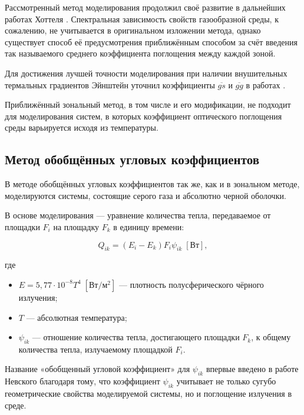 Рассмотренный метод моделирования продолжил своё развитие в дальнейших работах Хоттеля \cite{hottel-1, hottel-2}.
Спектральная зависимость свойств газообразной среды, к сожалению, не учитывается в оригинальном изложении метода, однако существует способ её предусмотрения приближённым способом за счёт введения так называемого среднего коэффициента поглощения между каждой зоной.

Для достижения лучшей точности моделирования при наличии внушительных термальных градиентов Эйнштейн уточнил коэффициенты $\overline{gs}$ и $\overline{gg}$ в работах \cite{einstein-1, einstein-2}.

Приближённый зональный метод, в том числе и его модификации, не подходит для моделирования систем, в которых коэффициент оптического поглощения среды варьируется исходя из температуры.

\subsection{Метод обобщённых угловых коэффициентов}

В методе обобщённых угловых коэффициентов так же, как и в зональном методе, моделируются системы, состоящие серого газа и абсолютно черной оболочки.

В основе моделирования — уравнение количества тепла, передаваемое от площадки $F_i$ на площадку $F_k$ в единицу времени:

\begin{equation}
	Q_{ik} = (E_i - E_k) F_i \psi_{ik} \; [\text{Вт}],
\end{equation}

\noindent где
\begin{itemize}
	\item $E = 5,77 \cdot 10^{-8} T^4 \; [\text{Вт}/\text{м}^2]$ — плотность полусферического чёрного излучения;
	\item $T$ — абсолютная температура;
	\item $\psi_{ik}$ — отношение количества тепла, достигающего площадки $F_k$, к общему количества тепла, излучаемому площадкой $F_i$.
\end{itemize}

Название «обобщенный угловой коэффициент» для $\psi_{ik}$ впервые введено в работе Невского \cite{nevskiy} благодаря тому, что коэффициент $\psi_{ik}$ учитывает не только сугубо геометрические свойства моделируемой системы, но и поглощение излучения в среде.

